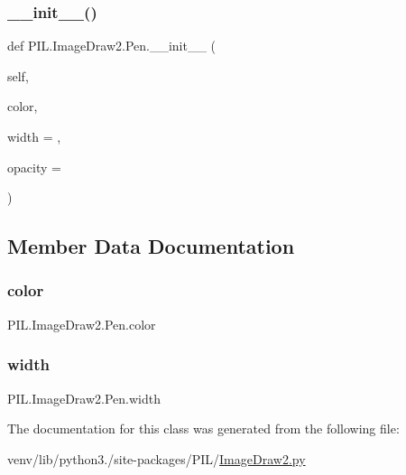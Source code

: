 \subsubsection{\texorpdfstring{\+\_\+\+\_\+init\+\_\+\+\_\+()}{\_\_init\_\_()}}
{\footnotesize\ttfamily def P\+I\+L.\+Image\+Draw2.\+Pen.\+\_\+\+\_\+init\+\_\+\+\_\+ (\begin{DoxyParamCaption}\item[{}]{self,  }\item[{}]{color,  }\item[{}]{width = {},  }\item[{}]{opacity = {} }\end{DoxyParamCaption})}



\subsection{Member Data Documentation}
\mbox{\label{classPIL_1_1ImageDraw2_1_1Pen_a41e85bc53d2faa1c2340d30796301c26}} 
\subsubsection{\texorpdfstring{color}{color}}
{\footnotesize\ttfamily P\+I\+L.\+Image\+Draw2.\+Pen.\+color}

\mbox{\label{classPIL_1_1ImageDraw2_1_1Pen_a9dbd25ce144d1b67f6fe7f8e0001f03f}} 
\subsubsection{\texorpdfstring{width}{width}}
{\footnotesize\ttfamily P\+I\+L.\+Image\+Draw2.\+Pen.\+width}



The documentation for this class was generated from the following file\+:\begin{DoxyCompactItemize}
\item 
venv/lib/python3./site-\/packages/\+P\+I\+L/\hyperlink{ImageDraw2_8py}{Image\+Draw2.\+py}\end{DoxyCompactItemize}
